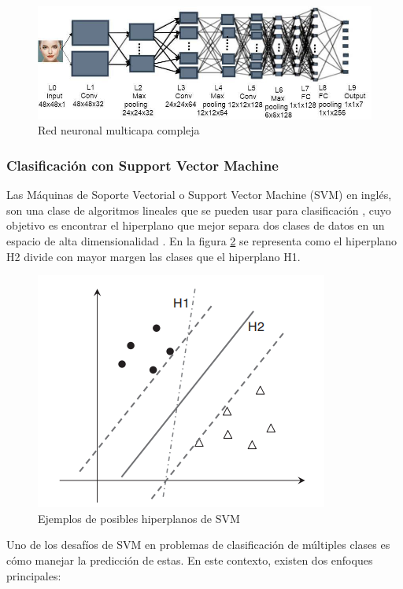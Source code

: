 \begin{figure}[H]
	\centering
	\includegraphics[width=0.7\linewidth]{figuras/capi 1/red-neuronal-multicapa-compleja}
	\caption{Red neuronal multicapa compleja \citep{abiodun2018state}}
	\label{fig:red-neuronal-multicapa-compleja}
\end{figure}

\subsubsection{Clasificación con Support Vector Machine}
Las Máquinas de Soporte Vectorial o Support Vector Machine (SVM) en inglés, son una clase de algoritmos lineales que se pueden usar para clasificación \citep{sammut2011encyclopedia}, cuyo objetivo es encontrar el hiperplano que mejor separa dos clases de datos en un espacio de alta dimensionalidad \citep{guenther2016support}. En la figura \ref{fig:ejemplos-de-posibles-hiperplanos-de-svm} se representa como el hiperplano H2 divide con mayor margen las clases que el hiperplano H1.
\begin{figure}[H]
	\centering
	\includegraphics[width=0.4\linewidth]{"figuras/capi 1/Ejemplos de posibles hiperplanos de SVM"}
	\caption{Ejemplos de posibles hiperplanos de SVM \citep{sammut2011encyclopedia}}
	\label{fig:ejemplos-de-posibles-hiperplanos-de-svm}
\end{figure}
Uno de los desafíos de SVM en problemas de clasificación de múltiples clases es cómo manejar la predicción de estas. En este contexto, existen dos enfoques principales:
